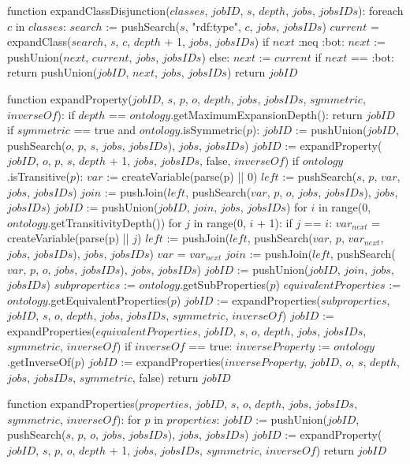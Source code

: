 function expandClassDisjunction($classes$, $jobID$, $s$, $depth$, $jobs$, $jobsIDs$):
    foreach $c$ in $classes$:
        $search$ := pushSearch($s$, "rdf:type", $c$, $jobs$, $jobsIDs$)
        $current$ = expandClass($search$, $s$, $c$, $depth$ + 1, $jobs$, $jobsIDs$)
        if $next$ :neq :bot:
            $next$ := pushUnion($next$, $current$, $jobs$, $jobsIDs$)
        else:
            $next$ := $current$
    if $next$ == :bot:
        return pushUnion($jobID$, $next$, $jobs$, $jobsIDs$)
    return $jobID$

function expandProperty($jobID$, $s$, $p$, $o$, $depth$, $jobs$, $jobsIDs$, $symmetric$, $inverseOf$):
    if $depth$ == $ontology$.getMaximumExpansionDepth():
        return $jobID$
    if $symmetric$ == true and $ontology$.isSymmetric($p$):
        $jobID$ := pushUnion($jobID$, pushSearch($o$, $p$, $s$, $jobs$, $jobsIDs$), $jobs$, $jobsIDs$)
        $jobID$ := expandProperty($jobID$, $o$, $p$, $s$, $depth$ + 1, $jobs$, $jobsIDs$, false, $inverseOf$)
    if $ontology$.isTransitive($p$):
        $var$ := createVariable(parse(p) || 0)
        $left$ := pushSearch($s$, $p$, $var$, $jobs$, $jobsIDs$)
        $join$ := pushJoin($left$, pushSearch($var$, $p$, $o$, $jobs$, $jobsIDs$), $jobs$, $jobsIDs$)
        $jobID$ := pushUnion($jobID$, $join$, $jobs$, $jobsIDs$)
        for $i$ in range(0, $ontology$.getTransitivityDepth())
            for $j$ in range(0, $i$ + 1):
                if $j$ == $i$: 
                    $var_{next}$ = createVariable(parse(p) || $j$)
                    $left$ := pushJoin($left$, pushSearch($var$, $p$, $var_{next}$, $jobs$, $jobsIDs$), $jobs$, $jobsIDs$)
                    $var$ = $var_{next}$
            $join$ := pushJoin($left$, pushSearch($var$, $p$, $o$, $jobs$, $jobsIDs$), $jobs$, $jobsIDs$)
            $jobID$ := pushUnion($jobID$, $join$, $jobs$, $jobsIDs$)
    $subproperties$ := $ontology$.getSubProperties($p$)
    $equivalentProperties$ := $ontology$.getEquivalentProperties($p$)
    $jobID$ := expandProperties($subproperties$, $jobID$, $s$, $o$, $depth$, $jobs$, $jobsIDs$, $symmetric$, $inverseOf$)
    $jobID$ := expandProperties($equivalentProperties$, $jobID$, $s$, $o$, $depth$, $jobs$, $jobsIDs$, $symmetric$, $inverseOf$)
    if $inverseOf$ == true:
        $inverseProperty$ := $ontology$.getInverseOf($p$)
        $jobID$ := expandProperties($inverseProperty$, $jobID$, $o$, $s$, $depth$, $jobs$, $jobsIDs$, $symmetric$, false)
    return $jobID$

function expandProperties($properties$, $jobID$, $s$, $o$, $depth$, $jobs$, $jobsIDs$, $symmetric$, $inverseOf$):
    for $p$ in $properties$:
        $jobID$ := pushUnion($jobID$, pushSearch($s$, $p$, $o$, $jobs$, $jobsIDs$), $jobs$, $jobsIDs$)
        $jobID$ := expandProperty($jobID$, $s$, $p$, $o$, $depth$ + 1, $jobs$, $jobsIDs$, $symmetric$, $inverseOf$)
    return $jobID$
